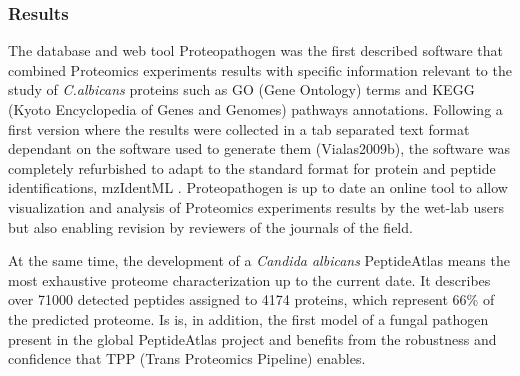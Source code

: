 \subsubsection*{Results}
The database and web tool Proteopathogen was the first described software 
that combined Proteomics experiments results with specific information 
relevant to the study of \textit{C.albicans} proteins such as GO (Gene Ontology)
terms and KEGG (Kyoto Encyclopedia of Genes and Genomes) pathways annotations.
Following a first version where the results were collected
in a tab separated text format dependant on the software used to generate 
them (Vialas2009b), the software was completely refurbished to adapt to
the standard format for protein and peptide identifications, mzIdentML 
\citep{Vialas2015}. Proteopathogen is up to date an online tool to allow
visualization and analysis of Proteomics experiments results by the wet-lab 
users but also enabling revision by reviewers of the journals of the field.

At the same time, the development of a \textit{Candida albicans} PeptideAtlas
means the most exhaustive proteome characterization up to the current date.
It describes over 71000 detected peptides assigned to 4174 proteins, which
represent 66\% of the predicted proteome. Is is, in addition, the first 
model of a fungal pathogen present in the global PeptideAtlas project and
benefits from the robustness and confidence that TPP (Trans Proteomics Pipeline)
enables.

\endinput
